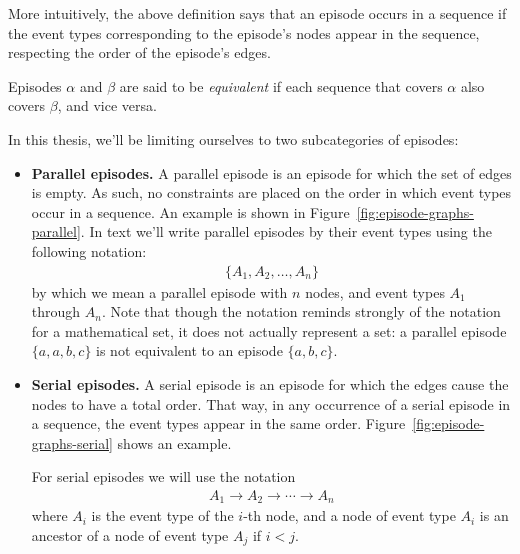 More intuitively, the above definition says that an episode occurs in a sequence if the event types corresponding to the episode's nodes appear in the sequence, respecting the order of the episode's edges.

\begin{definition}
Episodes $ \alpha $ and $ \beta $ are said to be \emph{equivalent} if each sequence that covers $ \alpha $ also covers $ \beta $, and vice versa.
\end{definition}

In this thesis, we'll be limiting ourselves to two subcategories of episodes:
\begin{itemize}
\item \textbf{Parallel episodes.} A parallel episode is an episode for which the set of edges is empty. As such, no constraints are placed on the order in which event types occur in a sequence. An example is shown in Figure~\ref{fig:episode-graphs-parallel}. In text we'll write parallel episodes by their event types using the following notation:
\begin{align*}
    \{ A_1, A_2, \ldots, A_n \}
\end{align*}
by which we mean a parallel episode with $ n $ nodes, and event types $ A_1 $ through $ A_n $. Note that though the notation reminds strongly of the notation for a mathematical set, it does not actually represent a set: a parallel episode $ \{ a, a, b, c \} $ is not equivalent to an episode $ \{ a, b, c \} $.

\item \textbf{Serial episodes.} A serial episode is an episode for which the edges cause the nodes to have a total order. That way, in any occurrence of a serial episode in a sequence, the event types appear in the same order. Figure~\ref{fig:episode-graphs-serial} shows an example.



For serial episodes we will use the notation
\begin{align*}
    A_1 \to A_2 \to \cdots \to A_n
\end{align*}
where $ A_i $ is the event type of the $ i $-th node, and a node of event type $ A_i $ is an ancestor of a node of event type $ A_j $ if $ i < j $.

\end{itemize}

